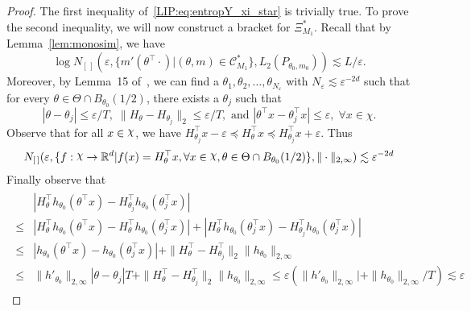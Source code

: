 {\begin{proof}
The first inequality of~\eqref{LIP:eq:entropY_xi_star} is trivially true. 
 To prove the second inequality, we will now construct a bracket for $\Xi_{M_1}^*$. Recall that by Lemma~\ref{lem:monosim}, we have
\begin{equation}\label{eq:mono_ent_61}
\log N_{[\,]}(\varepsilon,\{m'(\theta^\top \cdot)| (\theta,m) \in  \mathcal{C}^*_{M_1}\}, L_2(P_{\theta_0, m_0}) ) \lesssim L/\varepsilon.
\end{equation}
Moreover, by Lemma~15 of~\cite{Patra16}, we can find a $\theta_1, \theta_2, \ldots, \theta_{N_{\varepsilon}}$ with $N_{\varepsilon} \lesssim \varepsilon^{-2d}$ such that for every $\theta\in\Theta \cap B_{\theta_0}(1/2)$, there exists a $\theta_j$ such that
 \[|\theta - \theta_j| \le \varepsilon/T, \;\|H_\theta-H_{\theta_j}\|_2\le \varepsilon/T, \text{  and  } |\theta^{\top}x - \theta_j^{\top}x| \le \varepsilon, \;\forall  x\in\chi.\]
Observe that for all $x\in \rchi$, we have $H_{\theta_j}^\top x -\varepsilon \preceq H_\theta^\top x \preceq H_{\theta_j}^\top x +\varepsilon$. Thus
\begin{equation}\label{eq:H_theta_X_brac}
N_{[\,]}(\varepsilon, \{f:\rchi\rightarrow \R^d| f(x)=H_\theta^\top x, \forall x\in \rchi, \theta \in \Theta\cap B_{\theta_0}(1/2) \}, \|\cdot\|_{2,\infty}) \lesssim \varepsilon^{-2d}
\end{equation}
Finally observe that
\begin{align}\label{eq:H_h_brac}
\begin{split}
&|H_\theta^\top h_{\theta_0}(\theta^\top x)-H_{\theta_j}^\top h_{\theta_0}(\theta_j^\top x)| \\
\le{}& |H_\theta^\top h_{\theta_0}(\theta^\top x)-H_{\theta}^\top h_{\theta_0}(\theta_j^\top x)|+ |H_{\theta}^\top h_{\theta_0}(\theta_j^\top x)-H_{\theta_j}^\top h_{\theta_0}(\theta_j^\top x)|\\
\le{}& | h_{\theta_0}(\theta^\top x)- h_{\theta_0}(\theta_j^\top x)| +\|H_{\theta}^\top -H_{\theta_j}^\top \|_2 \|h_{\theta_0}\|_{2,\infty}\\
\le{}& \| h'_{\theta_0}\|_{2, \infty}|\theta- \theta_j| T +\|H_{\theta}^\top -H_{\theta_j}^\top \|_2 \|h_{\theta_0}\|_{2,\infty} \le\varepsilon (\| h'_{\theta_0}\|_{2, \infty}|+ \|h_{\theta_0}\|_{2,\infty}/T) \lesssim \varepsilon

\end{split}
\end{align}
\end{proof}}
